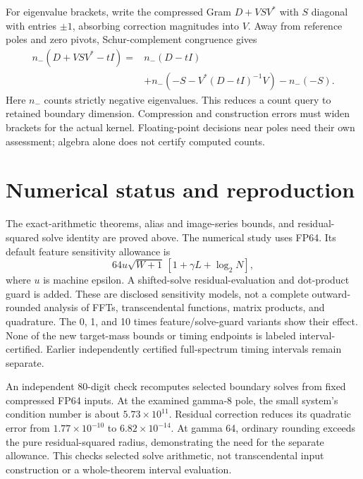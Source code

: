 \documentclass[11pt]{article}
\theoremstyle{definition}
\begin{document}
For eigenvalue brackets, write the compressed Gram $D+VSV^*$ with $S$
diagonal with entries $\pm1$, absorbing correction magnitudes into $V$.
Away from reference poles and zero pivots, Schur-complement congruence gives
\begin{align*}
n_-(D+VSV^*-tI)
={}&n_-(D-tI)\\
&+n_-\!\left(-S-V^*(D-tI)^{-1}V\right)-n_-(-S).
\end{align*}
Here $n_-$ counts strictly negative eigenvalues. This reduces a count
query to retained boundary dimension. Compression and construction
errors must widen brackets for the actual kernel. Floating-point decisions
near poles need their own assessment; algebra alone does not certify
computed counts.

\section{Numerical status and reproduction}
The exact-arithmetic theorems, alias and image-series bounds, and
residual-squared solve identity are proved above. The numerical study
uses FP64. Its default feature sensitivity allowance is
\[
64u\sqrt{W+1}\,[1+\gamma L+\log_2N],
\]
where $u$ is machine epsilon. A shifted-solve residual-evaluation and
dot-product guard is added. These are disclosed sensitivity models,
not a complete outward-rounded analysis of FFTs, transcendental functions,
matrix products, and quadrature. The 0, 1, and 10 times feature/solve-guard
variants show their effect. None of the new target-mass bounds or timing
endpoints is labeled interval-certified. Earlier independently certified
full-spectrum timing intervals remain separate.

An independent 80-digit check recomputes selected boundary solves from
fixed compressed FP64 inputs. At the examined gamma-8 pole, the small
system's condition number is about $5.73\times10^{11}$. Residual correction
reduces its quadratic error from $1.77\times10^{-10}$ to
$6.82\times10^{-14}$. At gamma 64, ordinary rounding exceeds the pure
residual-squared radius, demonstrating the need for the separate allowance.
This checks selected solve arithmetic, not transcendental input construction
or a whole-theorem interval evaluation.
\end{document}
